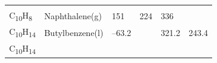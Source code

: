 \documentclass[
  9pt,
]{extbook}
\theoremstyle{definition}
\theoremstyle{definition}
\theoremstyle{definition}
\theoremstyle{remark}
\begin{document}
\begin{longtable}[]{@{}llllll@{}}
\begin{minipage}[t]{0.15\columnwidth}
\strut
\end{minipage} & \begin{minipage}[t]{0.14\columnwidth}\raggedright
\strut
\end{minipage} & \begin{minipage}[t]{0.14\columnwidth}\raggedright
\strut
\end{minipage}\tabularnewline
\begin{minipage}[t]{0.07\columnwidth}\raggedright
C\textsubscript{10}H\textsubscript{8}\strut
\end{minipage} & \begin{minipage}[t]{0.17\columnwidth}\raggedright
Naphthalene(g)\strut
\end{minipage} & \begin{minipage}[t]{0.15\columnwidth}\raggedright
151\strut
\end{minipage} & \begin{minipage}[t]{0.15\columnwidth}\raggedright
224\strut
\end{minipage} & \begin{minipage}[t]{0.14\columnwidth}\raggedright
336\strut
\end{minipage} & \begin{minipage}[t]{0.14\columnwidth}\raggedright
\strut
\end{minipage}\tabularnewline
\begin{minipage}[t]{0.07\columnwidth}\raggedright
C\textsubscript{10}H\textsubscript{14}\strut
\end{minipage} & \begin{minipage}[t]{0.17\columnwidth}\raggedright
Butylbenzene(l)\strut
\end{minipage} & \begin{minipage}[t]{0.15\columnwidth}\raggedright
--63.2\strut
\end{minipage} & \begin{minipage}[t]{0.15\columnwidth}\raggedright
\strut
\end{minipage} & \begin{minipage}[t]{0.14\columnwidth}\raggedright
321.2\strut
\end{minipage} & \begin{minipage}[t]{0.14\columnwidth}\raggedright
243.4\strut
\end{minipage}\tabularnewline
\begin{minipage}[t]{0.07\columnwidth}\raggedright
C\textsubscript{10}H\textsubscript{14}\strut
\end{minipage} & \begin{minipage}[t]{0.17\columnwidth}\raggedright

\end{minipage}
\end{longtable}
\end{document}
